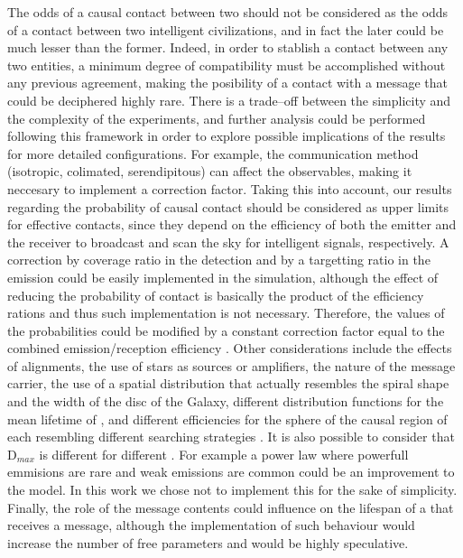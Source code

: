 The odds of a causal contact between two \cetis{} should not be
considered as the odds of a contact between two intelligent
civilizations, and in fact the later could be much lesser than the
former.
%
Indeed, in order to stablish a contact between
any two entities, a minimum degree of compatibility must be
accomplished without any previous agreement, making the posibility of
a contact with a message that could be deciphered highly rare.
%
There is a
trade--off between the simplicity and the complexity of the
experiments, and
further analysis could be performed following this framework in order to
explore possible implications of the results for more detailed
configurations.
%
For example, the communication method (isotropic, colimated,
serendipitous) can affect the observables, making it neccesary to
implement a correction factor.
%
Taking this into account, our results regarding the probability of
causal contact should be considered as upper limits for effective
contacts, since they depend on the
efficiency of both the emitter and the receiver to broadcast and scan
the sky for intelligent signals, respectively.
%
A correction by coverage ratio in the detection and by a targetting
ratio in the emission could be easily implemented in the simulation,
although the effect of reducing the probability of contact
is basically the product of the efficiency rations and thus 
such implementation is not necessary.
%
Therefore, the values of the
probabilities could be modified by a constant correction factor equal to
the combined emission/reception efficiency
\citep{smith_broadcasting_2009, anchordoqui_upper_2019,
forgan_collimated_2014}.
%
Other considerations include the effects of alignments, the use of
stars as sources or amplifiers, the nature of the message carrier,
the use of a spatial distribution that actually resembles the spiral shape
and the width of the disc of the Galaxy, different distribution functions for the mean lifetime
of \cetis{}, and different efficiencies for the sphere of the causal region
of each \ceti{} resembling different searching strategies
\citep{hippke_interstellar_2017}.
%
It is also possible to consider that D$_{max}$ is different for
different \cetis{}.  For example a power law where powerfull emmisions
are rare and weak emissions are common could be an improvement to the
model.
%
In this work we chose not to implement this for the sake of
simplicity.
%
Finally, the role of the message contents could influence on the 
lifespan of a \ceti{} that receives a message, although the
implementation of such behaviour would increase the number of free
parameters and would be highly speculative.
 

